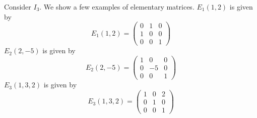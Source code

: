 \begin{Example}
    Consider $I_3$. We show a few examples of elementary matrices.
    $E_1(1,2)$ is given by
    \begin{equation*}
	E_1(1,2) = 
	\begin{pmatrix} 
	    0 & 1 & 0 \\
	    1 & 0 & 0 \\
	    0 & 0 & 1
	\end{pmatrix}
    \end{equation*}
    $E_2(2,-5)$ is given by
    \begin{equation*}
	E_2(2,-5) = 
	\begin{pmatrix} 
	    1 & 0 & 0 \\
	    0 & -5 & 0 \\
	    0 & 0 & 1
	\end{pmatrix}
    \end{equation*}
    $E_3(1,3,2)$ is given by
    \begin{equation*}
	E_3(1,3,2) = 
	\begin{pmatrix} 
	    1 & 0 & 2 \\
	    0 & 1 & 0 \\
	    0 & 0 & 1
	\end{pmatrix}
    \end{equation*}
\end{Example}
\endinput
